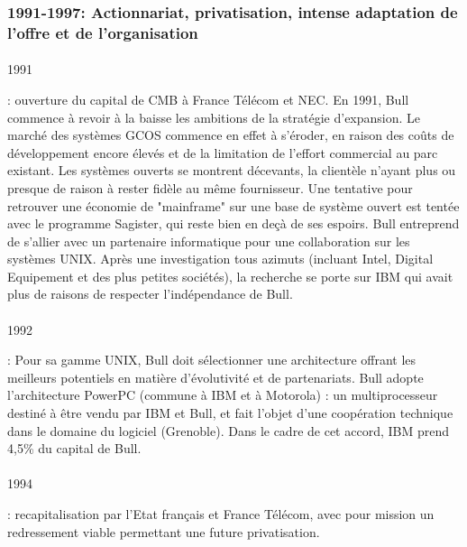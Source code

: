 \documentclass{article}
\begin{document}
		\subsubsection{1991-1997: Actionnariat, privatisation, intense adaptation de l’offre et de l’organisation}
		\paragraph{}
		\begin{bf}1991\end{bf}: ouverture du capital de CMB à France Télécom et NEC.\newline{}
		En 1991, Bull commence à revoir à la baisse les ambitions de la stratégie d'expansion. Le marché des systèmes GCOS 
		commence en effet à s'éroder, en raison des coûts de développement encore élevés et de la limitation de l'effort 
		commercial au parc existant.\newline{}
		Les systèmes ouverts se montrent décevants, la clientèle n'ayant plus ou presque de raison à rester fidèle au même 
		fournisseur. Une tentative pour retrouver une économie de "mainframe" sur une base de système ouvert est tentée avec 
		le programme Sagister, qui reste bien en deçà de ses espoirs.\newline{}
		Bull entreprend de s'allier avec un partenaire informatique pour une collaboration sur les systèmes UNIX. Après une 
		investigation tous azimuts (incluant Intel, Digital Equipement et des plus petites sociétés), la recherche se porte 
		sur IBM qui avait plus de raisons de respecter l'indépendance de Bull.
		\paragraph{}
		\begin{bf}1992\end{bf}: Pour sa gamme UNIX, Bull doit sélectionner une architecture offrant les meilleurs potentiels 
		en matière d’évolutivité et de partenariats. Bull adopte l'architecture PowerPC (commune à IBM et à Motorola) : un 
		multiprocesseur destiné à être vendu par IBM et Bull, et fait l’objet d’une coopération technique dans le domaine du 
		logiciel (Grenoble). Dans le cadre de cet accord, IBM prend 4,5\% du capital de Bull.
		\paragraph{}
		\begin{bf}1994\end{bf}: recapitalisation par l’Etat français et France Télécom, avec pour mission un redressement 
		viable permettant une future privatisation.
\end{document}
